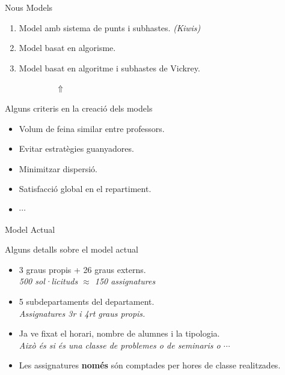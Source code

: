 \documentclass[twocolumn]{beamer}
\begin{document}
\begin{frame}
\begin{box1}{ \normalsize Nous Models }
	\begin{enumerate}
		\small
		\item Model amb sistema de punts i subhastes. \textit{(Kiwis)}
		\item Model basat en algorisme.
		\item Model basat en algoritme i subhastes de Vickrey.
	\end{enumerate}
\end{box1}
{\Huge \centering
	$
	\quad \quad  \quad \quad  \quad \quad \Uparrow
	$
}
\begin{box1}{\normalsize Alguns criteris en la creació dels models }
	\small
	\begin{itemize}
		\item Volum de feina similar entre professors.
		\item Evitar estratègies guanyadores.
		\item Minimitzar dispersió.
		\item Satisfacció global en el repartiment.
		\item $\cdots$
	\end{itemize}
\end{box1}
\end{frame}
\begin{frame}{Model Actual} %
\begin{box1}{\normalsize Alguns detalls sobre el model actual}
	\begin{itemize}
		\item 3 graus propis + 26 graus externs. \\ \textit{\footnotesize \color{blue} 500 sol·licituds $\approx$ 150 assignatures}
		\item 5 subdepartaments del departament. \\ \textit{ \footnotesize \color{blue} Assignatures 3r i 4rt graus propis.}
		\item  Ja ve fixat el horari, nombre de alumnes i la tipologia. \\ \textit{\footnotesize \color{blue} Això és si és una classe de problemes o de seminaris o $\cdots$}
		\item Les assignatures \textbf{només} són comptades per hores de classe realitzades.
	\end{itemize}
\end{box1}
\end{frame}
\end{document}
